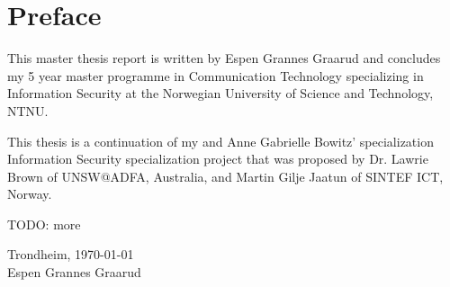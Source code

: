 \chapter*{Preface}

This master thesis report is written by Espen Grannes Graarud and concludes my 5
year master programme in Communication Technology specializing in Information
Security at the Norwegian University of Science and Technology, NTNU.

This thesis is a continuation of my and Anne Gabrielle Bowitz' specialization
Information Security specialization project that was proposed by Dr. Lawrie
Brown of UNSW@ADFA, Australia, and Martin Gilje Jaatun of SINTEF ICT, Norway.

TODO: more

\begin{center}
\vspace{4cm}
\noindent Trondheim, \today
\vspace{2cm}
\\Espen Grannes Graarud
\end{center}
